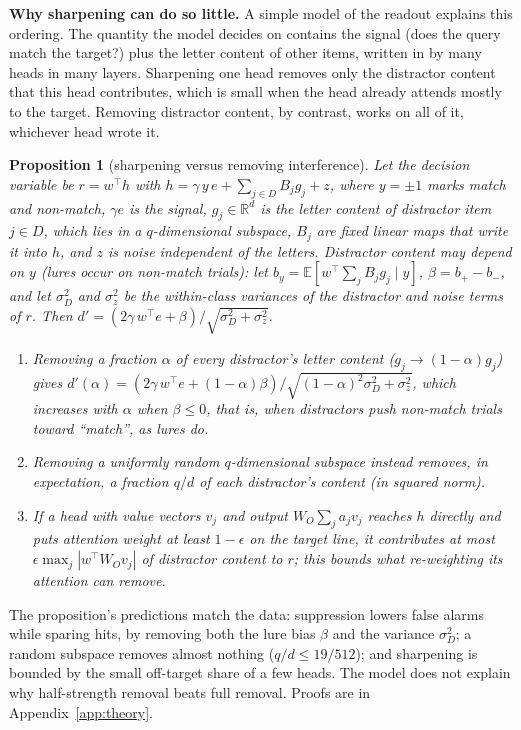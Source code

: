 \documentclass{article}
\newtheorem{proposition}{Proposition}
\begin{document}
\textbf{Why sharpening can do so little.} A simple model of the readout explains this ordering. The quantity the model decides on contains the signal (does the query match the target?) plus the letter content of other items, written in by many heads in many layers. Sharpening one head removes only the distractor content that this head contributes, which is small when the head already attends mostly to the target. Removing distractor content, by contrast, works on all of it, whichever head wrote it.

\begin{proposition}[sharpening versus removing interference]\label{prop:interference}
Let the decision variable be $r=w^\top h$ with $h=\gamma\,y\,e+\sum_{j\in D}B_j g_j+z$, where $y=\pm1$ marks match and non-match, $\gamma e$ is the signal, $g_j\in\mathbb{R}^d$ is the letter content of distractor item $j\in D$, which lies in a $q$-dimensional subspace, $B_j$ are fixed linear maps that write it into $h$, and $z$ is noise independent of the letters. Distractor content may depend on $y$ (lures occur on non-match trials): let $b_y=\mathbb{E}[w^\top\sum_jB_jg_j\mid y]$, $\beta=b_{+}-b_{-}$, and let $\sigma_D^2$ and $\sigma_z^2$ be the within-class variances of the distractor and noise terms of $r$. Then $d'=(2\gamma\,w^\top e+\beta)/\sqrt{\sigma_D^2+\sigma_z^2}$.
\begin{enumerate}\setlength{\itemsep}{1pt}\setlength{\topsep}{2pt}
  \item[(a)] Removing a fraction $\alpha$ of every distractor's letter content ($g_j\to(1-\alpha)g_j$) gives $d'(\alpha)=(2\gamma\,w^\top e+(1-\alpha)\beta)/\sqrt{(1-\alpha)^2\sigma_D^2+\sigma_z^2}$, which increases with $\alpha$ when $\beta\le0$, that is, when distractors push non-match trials toward ``match'', as lures do.
  \item[(b)] Removing a uniformly random $q$-dimensional subspace instead removes, in expectation, a fraction $q/d$ of each distractor's content (in squared norm).
  \item[(c)] If a head with value vectors $v_j$ and output $W_O\sum_j a_j v_j$ reaches $h$ directly and puts attention weight at least $1-\epsilon$ on the target line, it contributes at most $\epsilon\max_j|w^\top W_O v_j|$ of distractor content to $r$; this bounds what re-weighting its attention can remove.
\end{enumerate}
\end{proposition}

The proposition's predictions match the data: suppression lowers false alarms while sparing hits, by removing both the lure bias $\beta$ and the variance $\sigma_D^2$; a random subspace removes almost nothing ($q/d\le19/512$); and sharpening is bounded by the small off-target share of a few heads. The model does not explain why half-strength removal beats full removal. Proofs are in Appendix~\ref{app:theory}.
\end{document}
